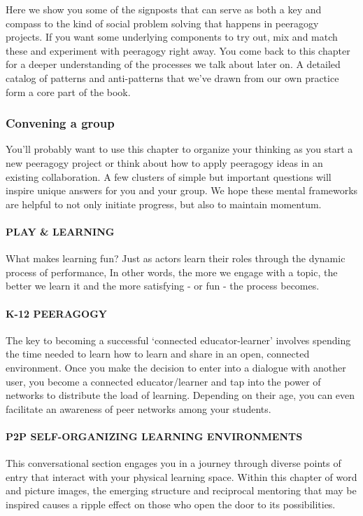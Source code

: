 Here we show you some of the signposts that can serve as both a key and
compass to the kind of social problem solving that happens in peeragogy
projects. If you want some underlying components to try out, mix and
match these and experiment with peeragogy right away. You come back to
this chapter for a deeper understanding of the processes we talk about
later on. A detailed catalog of patterns and anti-patterns that we've
drawn from our own practice form a core part of the book.

\subsubsection{Convening a group}

You'll probably want to use this chapter to organize your thinking as
you start a new peeragogy project or think about how to apply peeragogy
ideas in an existing collaboration. A few clusters of simple but
important questions will inspire unique answers for you and your group.
We hope these mental frameworks are helpful to not only initiate
progress, but also to maintain momentum.

 \paragraph{PLAY \& LEARNING} What
makes learning fun? Just as actors learn their roles through the dynamic
process of performance, In other words, the more we engage with a topic,
the better we learn it and the more satisfying - or fun - the process
becomes.

\paragraph{K-12 PEERAGOGY} The key to becoming a successful
`connected educator-learner' involves spending the time needed to learn
how to learn and share in an open, connected environment. Once you make
the decision to enter into a dialogue with another user, you become a
connected educator/learner and tap into the power of networks to
distribute the load of learning. Depending on their age, you can even
facilitate an awareness of peer networks among your students.

\paragraph{P2P SELF-ORGANIZING LEARNING ENVIRONMENTS} This conversational
section engages you in a journey through diverse points of entry that
interact with your physical learning space. Within this chapter of word
and picture images, the emerging structure and reciprocal mentoring that
may be inspired causes a ripple effect on those who open the door to its
possibilities.

